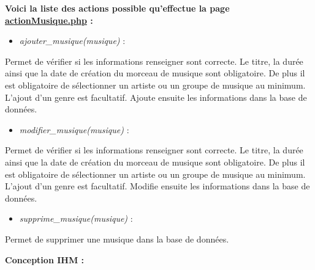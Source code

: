             \begin{paragraphe}
                \textbf{Voici la liste des actions possible qu'effectue la page \underline{actionMusique.php} :}
            
                \begin{itemize}
                    \item \emph{ajouter\_musique(musique)} :
                \end{itemize}
                \begin{paragraphe}
                    Permet de vérifier si les informations renseigner sont correcte.
                    Le titre, la durée ainsi que la date de création du morceau de musique sont obligatoire.
                    De plus il est obligatoire de sélectionner un artiste ou un groupe de musique au minimum. L'ajout d'un genre est facultatif.
                    Ajoute ensuite les informations dans la base de données.
                \end{paragraphe}
                
                \begin{itemize}
                    \item \emph{modifier\_musique(musique)} :
                \end{itemize}
                \begin{paragraphe}
                    Permet de vérifier si les informations renseigner sont correcte.
                    Le titre, la durée ainsi que la date de création du morceau de musique sont obligatoire.
                    De plus il est obligatoire de sélectionner un artiste ou un groupe de musique au minimum. L'ajout d'un genre est facultatif.
                    Modifie ensuite les informations dans la base de données.
                \end{paragraphe}
                
                \begin{itemize}
                    \item \emph{supprime\_musique(musique)} :
                \end{itemize}
                \begin{paragraphe}
                    Permet de supprimer une musique dans la base de données.
                \end{paragraphe}
            \end{paragraphe}

			\begin{paragraphe}
				\textbf{Conception IHM :}
			\end{paragraphe}
            
